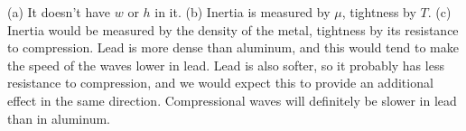 (a) It doesn't have $w$ or $h$ in it.
(b) Inertia is measured by $\mu$, tightness by $T$.
(c) Inertia would be measured by the density of the metal, tightness by its resistance to compression. Lead is more dense than aluminum,
and this would tend to make the speed of the waves lower in lead. Lead is also softer, so it probably has less resistance to compression,
and we would expect this to provide an additional effect in the same direction. Compressional waves will definitely be slower in lead
than in aluminum.
